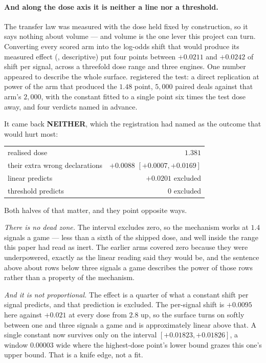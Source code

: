 \documentclass[11pt,letterpaper]{article}
\begin{document}
\paragraph{And along the dose axis it is neither a line nor a threshold.}
The transfer law was measured with the dose held fixed by construction, so it
says nothing about volume --- and volume is the one lever this project can
turn. Converting every scored arm into the log-odds shift that would produce
its measured effect
(, descriptive) put four points between
$+0.0211$ and $+0.0242$ of shift per signal, across a threefold dose range and
three engines. One number appeared to describe the whole surface.
 registered the test: a direct
replication at power of the arm that produced the $1.48$ point, $5{,}000$
paired deals against that arm's $2{,}000$, with the constant fitted to a
single point six times the test dose away, and four verdicts named in advance.

It came back \textbf{NEITHER}, which the registration had named as the outcome
that would hurt most:

\begin{center}
\small
\begin{tabular}{lr}
\toprule
realised dose & $1.381$ \\
their extra wrong declarations & $+0.0088$ $[+0.0007, +0.0169]$ \\
linear predicts & $+0.0201$ \quad excluded \\
threshold predicts & $0$ \quad excluded \\
\bottomrule
\end{tabular}
\end{center}

\noindent Both halves of that matter, and they point opposite ways.

\emph{There is no dead zone.} The interval excludes zero, so the mechanism
works at $1.4$ signals a game --- less than a sixth of the shipped dose, and
well inside the range this paper had read as inert. The earlier arms covered
zero because they were underpowered, exactly as the linear reading said they
would be, and the sentence above about rows below three signals a game
describes the power of those rows rather than a property of the mechanism.

\emph{And it is not proportional.} The effect is a quarter of what a constant
shift per signal predicts, and that prediction is excluded. The per-signal
shift is $+0.0095$ here against $+0.021$ at every dose from $2.8$ up, so the
surface turns on softly between one and three signals a game and is
approximately linear above that. A single constant now survives only on the
interval $[+0.01823, +0.01826]$, a window $0.00003$ wide where the highest-dose
point's lower bound grazes this one's upper bound. That is a knife edge, not a
fit.
\end{document}
